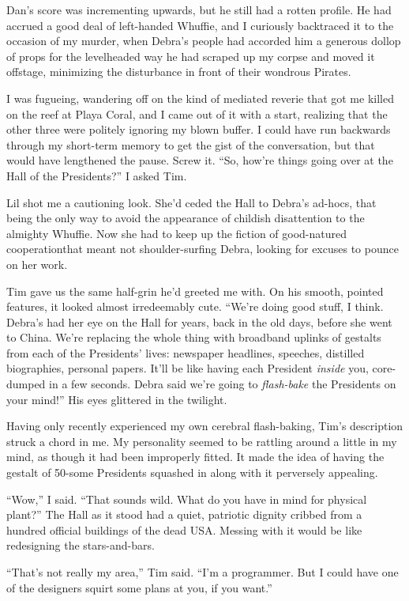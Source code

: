 Dan's score was incrementing upwards, but he still had a rotten
profile. He had accrued a good deal of left-handed Whuffie, and I
curiously backtraced it to the occasion of my murder, when Debra's
people had accorded him a generous dollop of props for the
levelheaded way he had scraped up my corpse and moved it offstage,
minimizing the disturbance in front of their wondrous Pirates.

I was fugueing, wandering off on the kind of mediated reverie that
got me killed on the reef at Playa Coral, and I came out of it with
a start, realizing that the other three were politely ignoring my
blown buffer. I could have run backwards through my short-term
memory to get the gist of the conversation, but that would have
lengthened the pause. Screw it. “So, how're things going over at
the Hall of the Presidents?” I asked Tim.

Lil shot me a cautioning look. She'd ceded the Hall to Debra's
ad-hocs, that being the only way to avoid the appearance of
childish disattention to the almighty Whuffie. Now she had to keep
up the fiction of good-natured cooperation{\dash}that meant not
shoulder-surfing Debra, looking for excuses to pounce on her work.

Tim gave us the same half-grin he'd greeted me with. On his smooth,
pointed features, it looked almost irredeemably cute. “We're doing
good stuff, I think. Debra's had her eye on the Hall for years,
back in the old days, before she went to China. We're replacing the
whole thing with broadband uplinks of gestalts from each of the
Presidents' lives: newspaper headlines, speeches, distilled
biographies, personal papers. It'll be like having each President
\emph{inside} you, core-dumped in a few seconds. Debra said we're
going to \emph{flash-bake} the Presidents on your mind!” His eyes
glittered in the twilight.

Having only recently experienced my own cerebral flash-baking,
Tim's description struck a chord in me. My personality seemed to be
rattling around a little in my mind, as though it had been
improperly fitted. It made the idea of having the gestalt of
50-some Presidents squashed in along with it perversely appealing.

“Wow,” I said. “That sounds wild. What do you have in mind for
physical plant?” The Hall as it stood had a quiet, patriotic
dignity cribbed from a hundred official buildings of the dead USA.
Messing with it would be like redesigning the stars-and-bars.

“That's not really my area,” Tim said. “I'm a programmer. But I
could have one of the designers squirt some plans at you, if you
want.”

